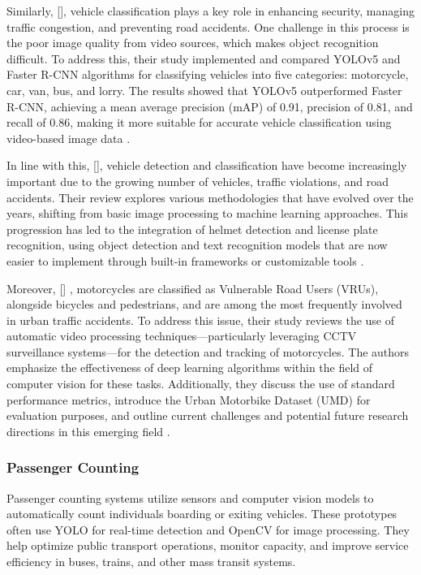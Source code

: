 \begin{refsection}
Similarly, \citeauthor{ong2022vehicle} [\citeyear{ong2022vehicle}], vehicle classification plays a key role in enhancing security, managing traffic congestion, and preventing road accidents. One challenge in this process is the poor image quality from video sources, which makes object recognition difficult. To address this, their study implemented and compared YOLOv5 and Faster R-CNN algorithms for classifying vehicles into five categories: motorcycle, car, van, bus, and lorry. The results showed that YOLOv5 outperformed Faster R-CNN, achieving a mean average precision (mAP) of 0.91, precision of 0.81, and recall of 0.86, making it more suitable for accurate vehicle classification using video-based image data \cite{ong2022vehicle}.


In line with this,\citeauthor{Sanjana2021} [\citeyear{Sanjana2021}], vehicle detection and classification have become increasingly important due to the growing number of vehicles, traffic violations, and road accidents. Their review explores various methodologies that have evolved over the years, shifting from basic image processing to machine learning approaches. This progression has led to the integration of helmet detection and license plate recognition, using object detection and text recognition models that are now easier to implement through built-in frameworks or customizable tools \cite{Sanjana2021}.


Moreover, \citeauthor{Espinosa2021} [\citeyear{Espinosa2021}] , motorcycles are classified as Vulnerable Road Users (VRUs), alongside bicycles and pedestrians, and are among the most frequently involved in urban traffic accidents. To address this issue, their study reviews the use of automatic video processing techniques—particularly leveraging CCTV surveillance systems—for the detection and tracking of motorcycles. The authors emphasize the effectiveness of deep learning algorithms within the field of computer vision for these tasks. Additionally, they discuss the use of standard performance metrics, introduce the Urban Motorbike Dataset (UMD) for evaluation purposes, and outline current challenges and potential future research directions in this emerging field \cite{Espinosa2021}.


\subsubsection{Passenger Counting}
    Passenger counting systems utilize sensors and computer vision models to automatically count individuals boarding or exiting vehicles. These prototypes often use YOLO for real-time detection and OpenCV for image processing. They help optimize public transport operations, monitor capacity, and improve service efficiency in buses, trains, and other mass transit systems.



\end{refsection}
